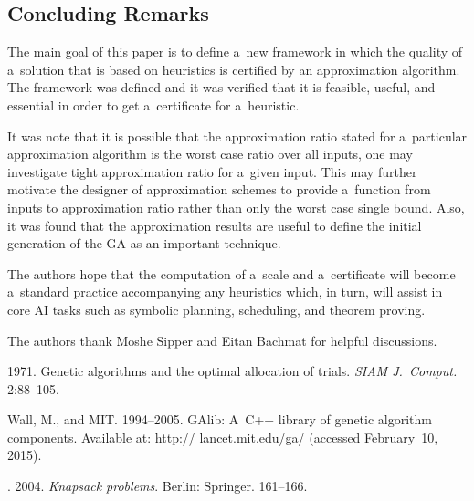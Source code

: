 \begin{multicols}{2}
\vspace*{-6pt}

\section{Concluding Remarks}
\label{s:Concluding}

\vspace*{-4pt}

\noindent
The main goal of this
paper is to define a~new framework in which the quality of a~solution that is based on heuristics is certified by an
approximation algorithm. The framework  was defined and it was
verified that
it is feasible, useful, and essential in order to get a~certificate
for a~heuristic.

It was note that it is possible that the approximation ratio
stated for a~particular approximation algorithm is the
worst case ratio over all inputs, one may investigate
tight approximation ratio for a~given input.
This may further motivate the designer of approximation
schemes to provide a~function from
inputs to approximation ratio rather than
only the worst case single bound. Also, it was found that
the approximation results are useful to define the initial generation
of the GA as an important technique.

The authors hope that the computation of a~scale and a~certificate will become a~standard practice accompanying any
heuristics which, in turn, will assist in core AI tasks such as symbolic planning,
scheduling, and theorem proving.


\Ack
\noindent
The authors thank Moshe Sipper and Eitan Bachmat for helpful discussions.

\renewcommand{\bibname}{\protect\rmfamily References}


{\small\frenchspacing
{%
\begin{thebibliography}{99}

 1971.
Genetic algorithms and the optimal allocation of
trials. \textit{SIAM J.~Comput.} 2:88--105.


Wall, M., and MIT. 1994--2005.
GAlib: A~C++ library of genetic algorithm
components. Available at: {\sf
http:// lancet.mit.edu/ga/} (accessed February~10, 2015).

. 2004.
\textit{Knapsack problems}.
Berlin: Springer. 161--166.


\end{thebibliography}}}
\end{multicols}
